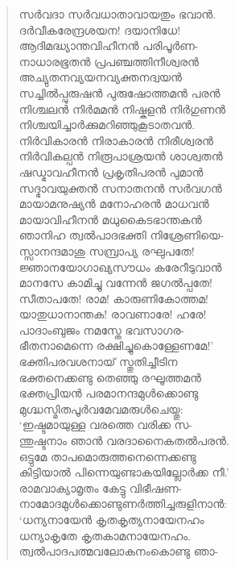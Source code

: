 \begin{verse}
സര്‍വദാ സര്‍വധാതാവായതും ഭവാന്‍.\\
ദര്‍വീകരേന്ദ്രശയന! ദയാനിധേ!\\
ആദിമദ്ധ്യാന്തവിഹീനന്‍ പരിപൂര്‍ണ-\\
നാധാരഭൂതന്‍ പ്രപഞ്ചത്തിനീശ്വരന്‍\\
അച്യുതനവ്യയനവ്യക്തനദ്വയന്‍\\
സച്ചില്‍പ്പുരുഷന്‍ പുരുഷോത്തമന്‍ പരന്‍\\
നിശ്ചലന്‍ നിര്‍മമന്‍ നിഷ്കളന്‍ നിര്‍ഗുണന്‍\\
നിശ്ചയിച്ചാര്‍ക്കുമറിഞ്ഞുകൂടാതവന്‍.\\
നിര്‍വികാരന്‍ നിരാകാരന്‍ നിരീശ്വരന്‍\\
നിര്‍വികല്പന്‍ നിരൂപാശ്രയന്‍ ശാശ്വതന്‍\\
ഷഡ്ഭാവഹീനന്‍ പ്രകൃതിപരന്‍ പുമാന്‍\\
സദ്ഭാവയുക്തന്‍ സനാതനന്‍ സര്‍വഗന്‍\\
മായാമനുഷ്യന്‍ മനോഹരന്‍ മാധവന്‍\\
മായാവിഹീനന്‍ മധുകൈടഭാന്തകന്‍\\
ഞാനിഹ ത്വല്‍പാദഭക്തി നിശ്രേണിയെ-\\
സ്സാനന്ദമാശു സമ്പ്രാപ്യ രഘുപതേ!\\
ജ്ഞാനയോഗാഖ്യസൗധം കരേറീടുവാന്‍\\
മാനസേ കാമിച്ചു വന്നേന്‍ ജഗല്‍പ്പതേ!\\
സീതാപതേ! രാമ! കാരുണികോത്തമ!\\
യാതുധാനാന്തക! രാവണാരേ! ഹരേ!\\
പാദാംബുജം നമസ്തേ ഭവസാഗര-\\
ഭീതനാമെന്നെ രക്ഷിച്ചുകൊള്ളേണമേ!’\\
ഭക്തിപരവശനായ് സ്തുതിച്ചീടിന\\
ഭക്തനെക്കണ്ടു തെഞ്ഞു രഘൂത്തമന്‍\\
ഭക്തപ്രിയന്‍ പരമാനന്ദമുള്‍ക്കൊണ്ടു\\
മുഗ്ദ്ധസ്മിതപൂര്‍വമേവമരുള്‍ചെയ്തു:\\
‘ഇഷ്ടമായുള്ള വരത്തെ വരിക്ക സ-\\
ന്തുഷ്ടനാം ഞാന്‍ വരദാനൈകതല്‍പരന്‍.\\
ഒട്ടുമേ താപമൊരുത്തനെന്നെക്കണ്ടു\\
കിട്ടിയാല്‍ പിന്നെയുണ്ടാകയില്ലോര്‍ക്ക നീ.’\\
രാമവാക്യാമൃതം കേട്ടു വിഭീഷണ-\\
നാമോദമുള്‍ക്കൊണ്ടുണര്‍ത്തിച്ചരുളിനാന്‍:\\
‘ധന്യനായേന്‍ കൃതകൃത്യനായേനഹം\\
ധന്യാകൃതേ കൃതകാമനായേനഹം.\\
ത്വല്‍പാദപത്മവലോകനംകൊണ്ടു ഞാ-\\

\end{verse}
